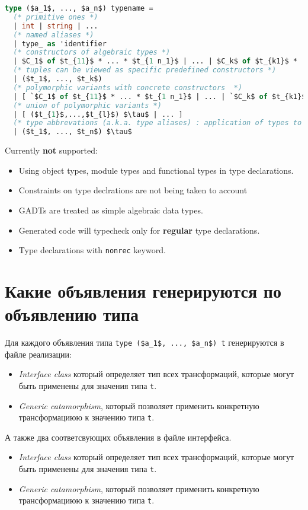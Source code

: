 \documentclass[acmsmall,review,anonymous]{acmart}\settopmatter{printfolios=true,printccs=false,printacmref=false}
\begin{document}
\begin{lstlisting}[language=ocaml]
type ($a_1$, ..., $a_n$) typename =
  (* primitive ones *)
  | int | string | ...
  (* named aliases *)
  | type_ as 'identifier
  (* constructors of algebraic types *)
  | $C_1$ of $t_{11}$ * ... * $t_{1 n_1}$ | ... | $C_k$ of $t_{k1}$ * ... * $t_{k n_k}$
  (* tuples can be viewed as specific predefined constructors *)
  | ($t_1$, ..., $t_k$)
  (* polymorphic variants with concrete constructors  *)
  | [ `$C_1$ of $t_{11}$ * ... * $t_{1 n_1}$ | ... | `$C_k$ of $t_{k1}$ * ... * $t_{k n_k}$ ] | [ ($t_{1}$,...,$t_{l}$) u ]
  (* union of polymorphic variants *)
  | [ ($t_{1}$,...,$t_{l}$) $\tau$ | ... ]
  (* type abbrevations (a.k.a. type aliases) : application of types to other types *)
  | ($t_1$, ..., $t_n$) $\tau$
\end{lstlisting}
Currently \textbf{not} supported:
\begin{itemize}
 \item Using object types, module types and functional types in type declarations.
 \item Constraints on type declrations are not being taken to account
 \item GADTs are treated as simple algebraic data types.
 \item Generated code will typecheck only for \textbf{regular} type declarations.
 \item Type declarations with \verb=nonrec= keyword.
\end{itemize}


\section{Какие объявления генерируются по объявлению типа}

Для каждого объявления типа \lstinline{type ($a_1$, ..., $a_n$) t} генерируются в файле реализации:
\begin{itemize}
 \item \textit{Interface class} который определяет тип всех трансформаций, которые могут быть применены для значения типа \lstinline{t}.
 \item \textit{Generic catamorphism}, который позволяет применить конкретную трансформациюю к значению типа \lstinline{t}.
\end{itemize}
А также два соответсвующих объявления в файле интерфейса.
\begin{itemize}
 \item \textit{Interface class} который определяет тип всех трансформаций, которые могут быть применены для значения типа \lstinline{t}.
 \item \textit{Generic catamorphism}, который позволяет применить конкретную трансформациюю к значению типа \lstinline{t}.
\end{itemize}
\end{document}
